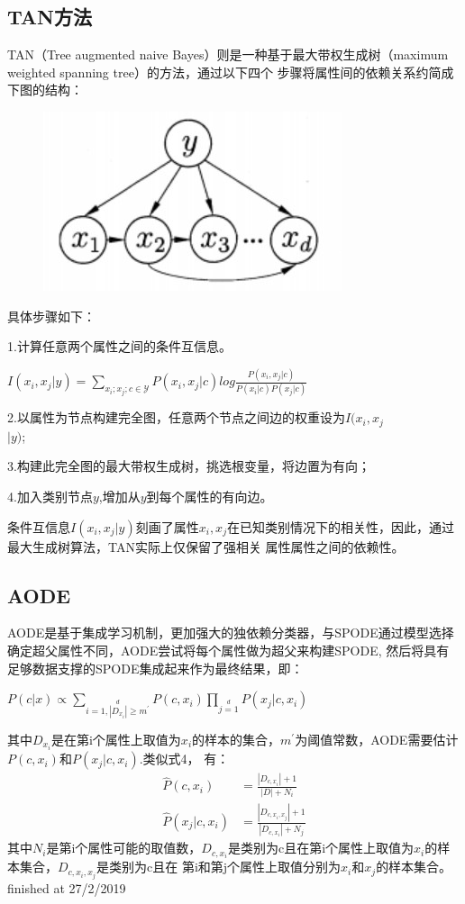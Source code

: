 \documentclass[UTF8]{ctexart}
\begin{document}
{\subsection{TAN方法}
TAN（Tree augmented naive Bayes）则是一种基于最大带权生成树（maximum weighted spanning tree）的方法，通过以下四个
步骤将属性间的依赖关系约简成下图的结构：
\begin{figure}[ht]
\centering
\includegraphics[scale=0.6]{05.jpg}    
\end{figure}
具体步骤如下：\par
1.计算任意两个属性之间的条件互信息。
\begin{center}
    $I(x_i,x_j|y)=\sum\limits_{x_i;x_j;c\in \mathcal Y}P(x_i,x_j|c)log\frac{P(x_i,x_j|c)}{P(x_i|c)P(x_j|c)}$
\end{center}\par
2.以属性为节点构建完全图，任意两个节点之间边的权重设为$I(x_i,x_j$\\$|y)$;\par
3.构建此完全图的最大带权生成树，挑选根变量，将边置为有向；\par
4.加入类别节点$y$,增加从$y$到每个属性的有向边。\par
条件互信息$I(x_i,x_j|y)$刻画了属性$x_i,x_j$在已知类别情况下的相关性，因此，通过最大生成树算法，TAN实际上仅保留了强相关
属性属性之间的依赖性。
\subsection{AODE}
AODE是基于集成学习机制，更加强大的独依赖分类器，与SPODE通过模型选择确定超父属性不同，AODE尝试将每个属性做为超父来构建SPODE,
然后将具有足够数据支撑的SPODE集成起来作为最终结果，即：
\begin{center}
    $P(c|x)\propto\sum\limits_{i=1,|D_{x_i}|\geq m^{'}}\limits^dP(c,x_i)\prod\limits_{j=1}\limits^dP(x_j|c,x_i)$
\end{center}
其中$D_{x_i}$是在第i个属性上取值为$x_i$的样本的集合，$m^{'}$为阈值常数，AODE需要估计$P(c,x_i)$和$P(x_j|c,x_i)$.类似式4，
有：
\begin{align*}
    \hat{P}(c,x_i)&=\frac{|D_{c,x_i}|+1}{|D|+N_i}\\[2ex]
    \hat{P}(x_j|c,x_i)&=\frac{|D_{c,x_i,x_j}|+1}{|D_{c,x_i}|+N_j}
\end{align*}
其中$N_i$是第i个属性可能的取值数，$D_{c,x_i}$是类别为c且在第i个属性上取值为$x_i$的样本集合，$D_{c,x_i,x_j}$是类别为c且在
第i和第j个属性上取值分别为$x_i$和$x_j$的样本集合。\\
finished at 27/2/2019
}
\end{document}
